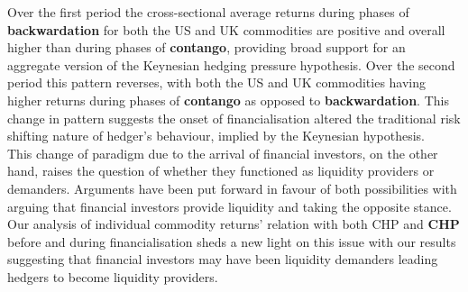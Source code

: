 \documentclass[
  authoryear,
  preprint,
  3p]{elsarticle}
\begin{document}
\medskip

Over the first period the cross-sectional average returns during phases
of \textbf{backwardation} for both the US and UK commodities are
positive and overall higher than during phases of \textbf{contango},
providing broad support for an aggregate version of the Keynesian
hedging pressure hypothesis. Over the second period this pattern
reverses, with both the US and UK commodities having higher returns
during phases of \textbf{contango} as opposed to \textbf{backwardation}.
This change in pattern suggests the onset of financialisation altered
the traditional risk shifting nature of hedger's behaviour, implied by
the Keynesian hypothesis.\\
This change of paradigm due to the arrival of financial investors, on
the other hand, raises the question of whether they functioned as
liquidity providers or demanders. Arguments have been put forward in
favour of both possibilities with \citet{moskowitz_time_2012} arguing
that financial investors provide liquidity and \citet{kang_tale_2020}
taking the opposite stance. Our analysis of individual commodity
returns' relation with both CHP and \textbf{CHP} before and during
financialisation sheds a new light on this issue with our results
suggesting that financial investors may have been liquidity demanders
leading hedgers to become liquidity providers.

\medskip
\end{document}
